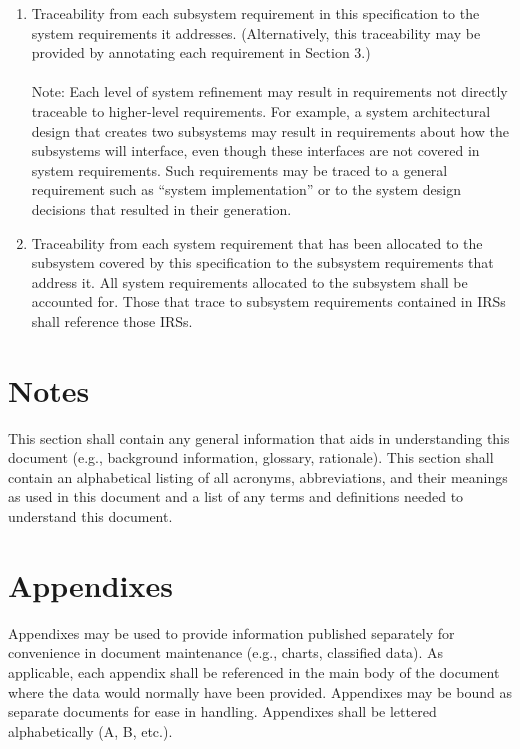 \begin{enumerate}
\itemsep1pt\parskip0pt
\item
  Traceability from each subsystem requirement in this specification to
  the system requirements it addresses. (Alternatively, this
  traceability may be provided by annotating each requirement in Section
  3.) \\\\ Note: Each level of system refinement may result in
  requirements not directly traceable to higher-level requirements. For
  example, a system architectural design that creates two subsystems may
  result in requirements about how the subsystems will interface, even
  though these interfaces are not covered in system requirements. Such
  requirements may be traced to a general requirement such as ``system
  implementation'' or to the system design decisions that resulted in
  their generation.
\item
  Traceability from each system requirement that has been allocated to
  the subsystem covered by this specification to the subsystem
  requirements that address it. All system requirements allocated to the
  subsystem shall be accounted for. Those that trace to subsystem
  requirements contained in IRSs shall reference those IRSs.
\end{enumerate}

\section{Notes}

This section shall contain any general information that aids in
understanding this document (e.g., background information, glossary,
rationale). This section shall contain an alphabetical listing of all
acronyms, abbreviations, and their meanings as used in this document and
a list of any terms and definitions needed to understand this document.

\appendix

\section{Appendixes}

Appendixes may be used to provide information published separately for
convenience in document maintenance (e.g., charts, classified data). As
applicable, each appendix shall be referenced in the main body of the
document where the data would normally have been provided. Appendixes
may be bound as separate documents for ease in handling. Appendixes
shall be lettered alphabetically (A, B, etc.).

